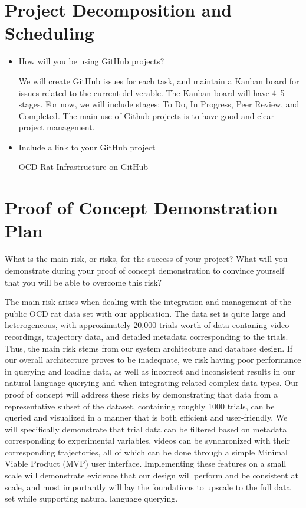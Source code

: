 \documentclass{article}
\begin{document}
\section{Project Decomposition and Scheduling}

\begin{itemize}
  \item How will you be using GitHub projects?
  
  We will create GitHub issues for each task, and maintain a Kanban board for issues related to the current deliverable.
  The Kanban board will have 4–5 stages. For now, we will include stages: To Do, In Progress, Peer Review, and Completed. The main use of Github projects is to have good and clear project management.

  \item Include a link to your GitHub project
  
  \href{https://github.com/NathanPerry11/OCD-Rat-Infrastructure}{OCD‑Rat‑Infrastructure on GitHub}
\end{itemize}


\section{Proof of Concept Demonstration Plan}

What is the main risk, or risks, for the success of your project?  What will you
demonstrate during your proof of concept demonstration to convince yourself that
you will be able to overcome this risk?

\par{The main risk arises when dealing with the integration and management of the public OCD rat data set with our application.
 The data set is quite large and heterogeneous, with approximately 20,000 trials worth of data contaning video recordings, trajectory data, 
 and detailed metadata corresponding to the trials. Thus, the main risk stems from our system architecture and database design. 
 If our overall architecture proves to be inadequate, we risk having poor performance in querying and loading data, as well as incorrect 
 and inconsistent results in our natural language querying and when integrating related complex data types. \newline \indent
 Our proof of concept will address these risks by demonstrating that data from a representative subset of the dataset, 
 containing roughly 1000 trials, can be queried and visualized in a manner that is both efficient and user-friendly. 
 We will specifically demonstrate that trial data can be filtered based on metadata corresponding to experimental variables, videos 
 can be synchronized with their corresponding trajectories, all of which can be done through a simple Minimal Viable Product (MVP) 
 user interface. Implementing these features on a small scale will demonstrate evidence that our design will perform and 
 be consistent at scale, and most importantly will lay the foundations to upscale to the full data set while supporting 
 natural language querying.}
\end{document}

